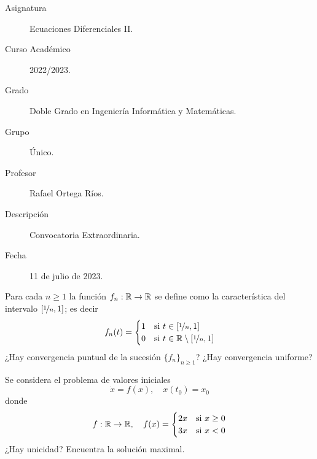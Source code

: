 \documentclass[12pt]{article}
\begin{document}

    
    

    \begin{description}
        \item[Asignatura] Ecuaciones Diferenciales II.
        \item[Curso Académico] 2022/2023.
        \item[Grado] Doble Grado en Ingeniería Informática y Matemáticas.
        \item[Grupo] Único.
        \item[Profesor] Rafael Ortega Ríos.
        \item[Descripción] Convocatoria Extraordinaria.
        \item[Fecha] 11 de julio de 2023.
    \end{description}
    \newpage


    
    \begin{ejercicio}
        Para cada $n \geq 1$ la función $f_n : \mathbb{R} \to \mathbb{R}$ se define como la característica del intervalo $\left[\nicefrac{1}{n}, 1\right]$; es decir
        \[
        f_n(t) = \begin{cases}
            1 & \text{si } t \in \left[\nicefrac{1}{n}, 1\right] \\
            0 & \text{si } t \in \mathbb{R} \setminus \left[\nicefrac{1}{n}, 1\right]
        \end{cases}
        \]
        ¿Hay convergencia puntual de la sucesión $\{f_n\}_{n \geq 1}$? ¿Hay convergencia uniforme?
    \end{ejercicio}

    \begin{ejercicio}
        Se considera el problema de valores iniciales
        \[
        \dot{x} = f(x), \quad x(t_0) = x_0
        \]
        donde
        \[
        f : \mathbb{R} \to \mathbb{R}, \quad f(x) = \begin{cases}
            2x & \text{si } x \geq 0 \\
            3x & \text{si } x < 0
        \end{cases}
        \]
        ¿Hay unicidad? Encuentra la solución maximal.
    \end{ejercicio}
\end{document}
